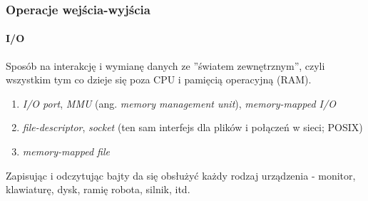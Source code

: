 \documentclass[aspectratio=169]{beamer}
\begin{document}
\begin{frame}
    \frametitle{Operacje wejścia-wyjścia}
    \framesubtitle{I/O}

    Sposób na interakcję i wymianę danych ze ''światem zewnętrznym'', czyli
    wszystkim tym co dzieje się poza CPU i pamięcią operacyjną (RAM).

    \begin{enumerate}
        \item \emph{I/O port}, \emph{MMU} (ang. \emph{memory management unit}),
            \emph{memory-mapped I/O}
        \item \emph{file-descriptor}, \emph{socket} (ten sam interfejs dla
            plików i połączeń w sieci; POSIX)
        \item \emph{memory-mapped file}
    \end{enumerate}

    Zapisując i odczytując bajty da się obsłużyć każdy rodzaj urządzenia -
    monitor, klawiaturę, dysk, ramię robota, silnik, itd.
\end{frame}
\end{document}
